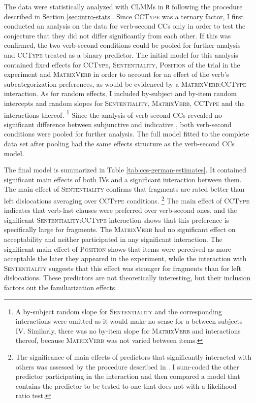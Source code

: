 The data were statistically analyzed with CLMMs in \texttt{R} following the procedure described in Section \ref{sec:intro-stats}. Since \textsc{CCType} was a ternary factor, I first conducted an analysis on the data for verb-second CCs only in order to test the conjecture that they did not differ significantly from each other. If this was confirmed, the two verb-second conditions could be pooled for further analysis and \textsc{CCType} treated as a binary predictor. The initial model for this analysis contained fixed effects for \textsc{CCType}, \textsc{Sententiality}, \textsc{Position} of the trial in the experiment and \textsc{MatrixVerb} in order to account for an effect of the verb's subcategorization preferences, as would be evidenced by a \textsc{MatrixVerb:CCType} interaction. As for random effects, I included by-subject and by-item random intercepts and random slopes for \textsc{Sententiality}, \textsc{MatrixVerb}, \textsc{CCType} and the interactions thereof.%
% 
\footnote{A by-subject random slope for \textsc{Sententiality} and the corresponding interactions were omitted as it would make no sense for a between subjects IV. Similarly, there was no by-item slope for \textsc{MatrixVerb} and interactions thereof, because \textsc{MatrixVerb} was not varied between items.}\afterfn%
%
Since the analysis of verb-second CCs revealed no significant difference between subjunctive and indicative , both verb-second conditions were pooled for further analysis. The full model fitted to the complete data set after pooling had the same effects structure as the verb-second CCs model.

The final model is summarized in Table \ref{tab:ccs-german-estimates}. It contained significant main effects of both IVs and a significant interaction between them. The main effect of \textsc{Sententiality}  confirms that fragments are rated better than left dislocations averaging over \textsc{CCType} conditions.%
%
\footnote{The significance of main effects of predictors that significantly interacted with others was assessed by the procedure described in \citet{levy2018}. I sum-coded the other predictor participating in the interaction and then compared a model that contains the predictor to be tested to one that does not with a likelihood ratio test.}\afterfn%
%
The main effect of \textsc{CCType}  indicates that verb-last clauses were preferred over verb-second ones, and the significant \textsc{Sententiality:CCType}  interaction shows that this preference is specifically large for fragments. 
The \textsc{MatrixVerb} had no significant effect on acceptability and neither participated in any significant interaction. The significant main effect of \textsc{Position}  shows that items were perceived as more acceptable the later they appeared in the experiment, while the interaction with \textsc{Sententiality}  suggests that this effect was stronger for fragments than for left dislocations. These predictors are not theoretically interesting, but their inclusion factors out the familiarization effects. 

